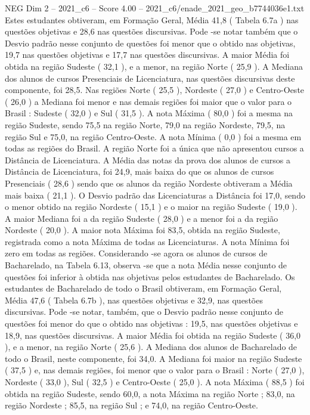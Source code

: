 \begin{textsample}{NEG Dim 2 – 2021\_c6 – Score 4.00 – 2021\_c6/enade\_2021\_geo\_b7744036e1.txt}
Estes estudantes obtiveram, em Formação Geral, Média 41,8 ( Tabela 6.7a ) nas questões objetivas e 28,6 nas questões discursivas.
Pode -se notar também que o Desvio padrão nesse conjunto de questões foi menor que o obtido nas objetivas, 19,7 nas questões objetivas e 17,7 nas questões discursivas.
A maior Média foi obtida na região Sudeste ( 32,1 ), e a menor, na região Norte ( 25,9 ).
A Mediana dos alunos de cursos Presenciais de Licenciatura, nas questões discursivas deste componente, foi 28,5.
Nas regiões Norte ( 25,5 ), Nordeste ( 27,0 ) e Centro-Oeste ( 26,0 ) a Mediana foi menor e nas demais regiões foi maior que o valor para o Brasil : Sudeste ( 32,0 ) e Sul ( 31,5 ).
A nota Máxima ( 80,0 ) foi a mesma na região Sudeste, sendo 75,5 na região Norte, 79,0 na região Nordeste, 79,5, na região Sul e 75,0, na região Centro-Oeste.
A nota Mínima ( 0,0 ) foi a mesma em todas as regiões do Brasil.
A região Norte foi a única que não apresentou cursos a Distância de Licenciatura.
A Média das notas da prova dos alunos de cursos a Distância de Licenciatura, foi 24,9, mais baixa do que os alunos de cursos Presenciais ( 28,6 ) sendo que os alunos da região Nordeste obtiveram a Média mais baixa ( 21,1 ).
O Desvio padrão das Licenciaturas a Distância foi 17,0, sendo o menor obtido na região Nordeste ( 15,1 ) e o maior na região Sudeste ( 19,0 ).
A maior Mediana foi a da região Sudeste ( 28,0 ) e a menor foi a da região Nordeste ( 20,0 ).
A maior nota Máxima foi 83,5, obtida na região Sudeste, registrada como a nota Máxima de todas as Licenciaturas.
A nota Mínima foi zero em todas as regiões.
Considerando -se agora os alunos de cursos de Bacharelado, na Tabela 6.13, observa -se que a nota Média nesse conjunto de questões foi inferior à obtida nas objetivas pelos estudantes de Bacharelado.
Os estudantes de Bacharelado de todo o Brasil obtiveram, em Formação Geral, Média 47,6 ( Tabela 6.7b ), nas questões objetivas e 32,9, nas questões discursivas.
Pode -se notar, também, que o Desvio padrão nesse conjunto de questões foi menor do que o obtido nas objetivas : 19,5, nas questões objetivas e 18,9, nas questões discursivas.
A maior Média foi obtida na região Sudeste ( 36,0 ), e a menor, na região Norte ( 25,6 ).
A Mediana dos alunos de Bacharelado de todo o Brasil, neste componente, foi 34,0.
A Mediana foi maior na região Sudeste ( 37,5 ) e, nas demais regiões, foi menor que o valor para o Brasil : Norte ( 27,0 ), Nordeste ( 33,0 ), Sul ( 32,5 ) e Centro-Oeste ( 25,0 ).
A nota Máxima ( 88,5 ) foi obtida na região Sudeste, sendo 60,0, a nota Máxima na região Norte ; 83,0, na região Nordeste ; 85,5, na região Sul ; e 74,0, na região Centro-Oeste.

\end{textsample}
